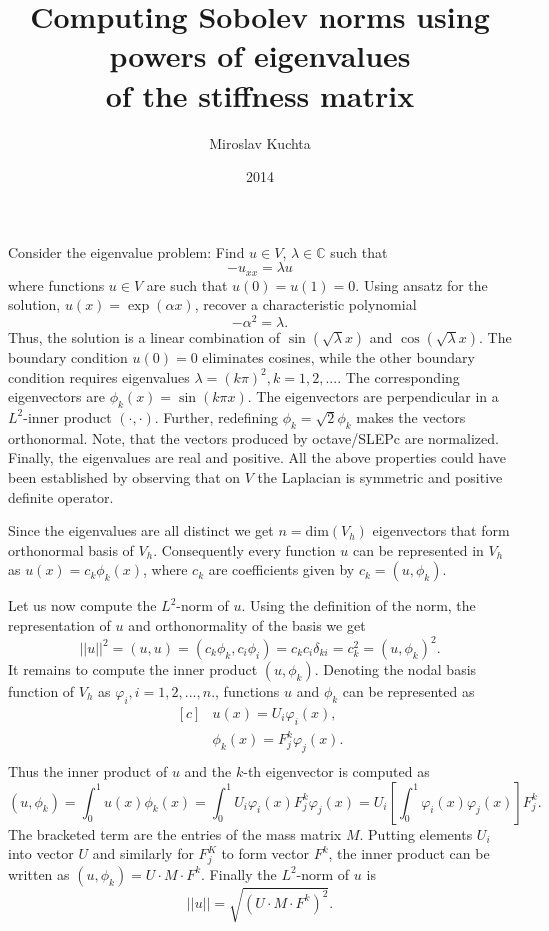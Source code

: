 \documentclass[a4paper,11pt]{article}
\title{Computing Sobolev norms using powers of eigenvalues\\ of the
 stiffness matrix}
\author{Miroslav Kuchta}
\date{2014}
\begin{document}
\maketitle

Consider the eigenvalue problem: Find $u\in V$, $\lambda\in\mathbb{C}$ such that 
\begin{equation}
 \label{p1}
-u_{xx}=\lambda u
\end{equation}
where functions $u\in V$ are such that $u(0)=u(1)=0$. Using ansatz for the
solution, $u(x)=\exp(\alpha x)$, recover a characteristic polynomial
\[
-\alpha^2 = \lambda.
\]
Thus, the solution is a linear combination of $\sin(\sqrt{\lambda}x)$ and
$\cos(\sqrt{\lambda}x)$. The boundary condition $u(0)=0$ eliminates cosines,
while the other boundary condition requires eigenvalues
$\lambda=(k\pi)^2, k=1,2,...$. The corresponding eigenvectors are
$\phi_k(x)=\sin(k\pi x)$. The eigenvectors are perpendicular in a $L^2$-inner 
product $(\cdot,\cdot)$. Further, redefining $\phi_k=\sqrt{2}\phi_k$ makes the
vectors orthonormal. Note, that the vectors produced by octave/SLEPc are
normalized. Finally, the eigenvalues are real and positive. All the above
properties could have been established by observing that on $V$ the Laplacian
is symmetric and positive definite operator.

Since the eigenvalues are all distinct we get $n=\text{dim}(V_h)$ eigenvectors
that form orthonormal basis of $V_h$. Consequently every function $u$ can be 
represented in $V_h$ as $u(x)=c_k\phi_k(x)$, where $c_k$ are coefficients given
by $c_k=(u, \phi_k)$. 

Let us now compute the $L^2$-norm of $u$. Using the definition of the norm,
the representation of $u$ and orthonormality of the basis we get
\[
||u||^2 = (u, u) = (c_k \phi_k, c_i \phi_i)=c_k c_i \delta_{ki}=c_k^2=(u, \phi_k)^2.
\]
It remains to compute the inner product $(u, \phi_k)$. Denoting the nodal basis
function of $V_h$ as $\varphi_i, i=1, 2, ..., n$., functions $u$ and $\phi_k$
can be represented as
\[
\begin{aligned}[c]
&u(x)=U_i\varphi_i(x),\\
&\phi_k(x)=F^k_j\varphi_j(x).\\
\end{aligned}
\]
Thus the inner product of $u$ and the $k$-th eigenvector is computed as 
\[
(u, \phi_k)=\int_0^1u(x)\phi_k(x)=\int_0^1 U_i\varphi_i(x) F^k_j\varphi_j(x) =
U_i \left[\int_0^1 \varphi_i(x) \varphi_j(x)\right] F^k_j.
\]
The bracketed term are the entries of the mass matrix $M$. Putting elements $U_i$ into vector $U$ and similarly for $F^K_j$ to form vector $F^k$, the inner
product can be written as $(u, \phi_k) = U\cdot M\cdot F^k$.
Finally the $L^2$-norm of $u$ is 
\begin{equation}
\label{eq:l2norm}
||u||=\sqrt{(U\cdot M\cdot F^k)^2}.
\end{equation}
\end{document}
